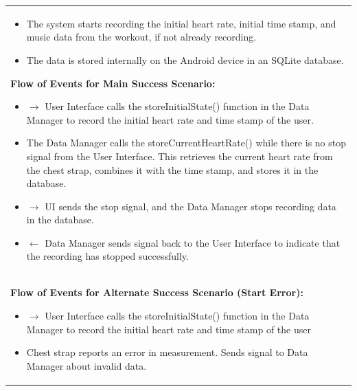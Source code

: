 \documentclass[letterpaper,english, 12pt]{scrreprt}
\begin{document}
\begin{center}
\begin{longtable}{|C{15cm}|}
                                \begin{itemize}
                                        \item The system starts recording the initial heart rate, initial time stamp, and music data from the workout, if not already recording.
                                        \item The data is stored internally on the Android device in an SQLite database.
                                \end{itemize}
                        \begin{flushleft}
                                \textbf{Flow of Events for Main Success Scenario: }
                        \end{flushleft}
                                \begin{itemize}
                                        \item $\rightarrow$ User Interface calls the storeInitialState() function in the Data Manager to record the initial heart rate and time stamp of the user.
                                        \item The Data Manager calls the storeCurrentHeartRate() while there is no stop signal from the User Interface. This retrieves the current heart rate from the chest strap, combines it with the time stamp, and stores it in the database.
                                        \item $\rightarrow$ UI sends the stop signal, and the Data Manager stops recording data in the database.
                                        \item $\leftarrow$ Data Manager sends signal back to the User Interface to indicate that the recording has stopped successfully.
                               \end{itemize}
{{\bfseries}} \\
                        \begin{flushleft}
                                \textbf{Flow of Events for Alternate Success Scenario (Start Error): }
                        \end{flushleft}
                                \begin{itemize}
                                        \item $\rightarrow$ User Interface calls the storeInitialState() function in the Data Manager to record the initial heart rate and time stamp of the user
                                        \item Chest strap reports an error in measurement. Sends signal to Data Manager about invalid data.

\end{itemize}
\end{longtable}
\end{center}
\end{document}
